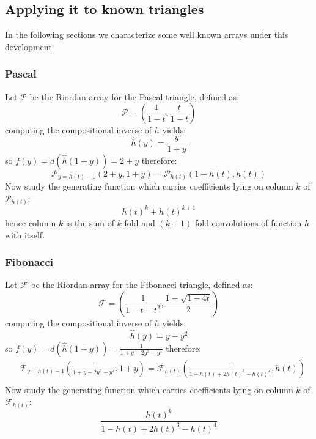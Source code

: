 \subsection{Applying it to known triangles}

In the following sections we characterize some well known 
arrays under this development.

\subsubsection{Pascal}
Let $\mathcal{P}$ be the Riordan array for the Pascal triangle,
defined as:
\begin{displaymath} 
    \mathcal{P} = \left(\frac{1}{1-t}, \frac{t}{1-t}  \right)
\end{displaymath} 
computing the compositional inverse of $h$ yields:
\begin{displaymath} 
    \hat{h}(y) = \frac{y}{1+y}
\end{displaymath} 
so $f(y)=d(\hat{h}(1+y))=2+y$ therefore:
\begin{displaymath} 
    \mathcal{P}_{y=h(t)-1}\left( 2+y, 1+y \right)= \mathcal{P}_{h(t)}\left( 1+h(t), h(t) \right)
\end{displaymath} 
Now study the generating function which carries coefficients lying on column $k$
of $\mathcal{P}_{h(t)}$:
\begin{displaymath} 
    h(t)^k + h(t)^{k+1}
\end{displaymath} 
hence column $k$ is the sum of $k$-fold and $(k+1)$-fold convolutions 
of function $h$ with itself.

\subsubsection{Fibonacci}
Let $\mathcal{F}$ be the Riordan array for the Fibonacci triangle,
defined as:
\begin{displaymath} 
    \mathcal{F} = \left(\frac{1}{1-t-t^2}, \frac{1-\sqrt{1-4t}}{2}  \right)
\end{displaymath} 
computing the compositional inverse of $h$ yields:
\begin{displaymath} 
    \hat{h}(y) = y - y^2
\end{displaymath} 
so $f(y)=d(\hat{h}(1+y))=\frac{1}{1+y-2y^3-y^4}$ therefore:
\begin{displaymath} 
    \begin{split} 
        & \mathcal{F}_{y=h(t)-1}\left( \frac{1}{1+y-2y^3-y^4}, 1+y \right) = \mathcal{F}_{h(t)}\left( \frac{1}{1-h(t)+2h(t)^3-h(t)^4}, h(t) \right)\\
    \end{split} 
\end{displaymath} 
Now study the generating function which carries coefficients lying on column $k$
of $\mathcal{F}_{h(t)}$:
\begin{displaymath} 
    \frac{h(t)^k}{1-h(t)+2h(t)^3-h(t)^4}
\end{displaymath} 

